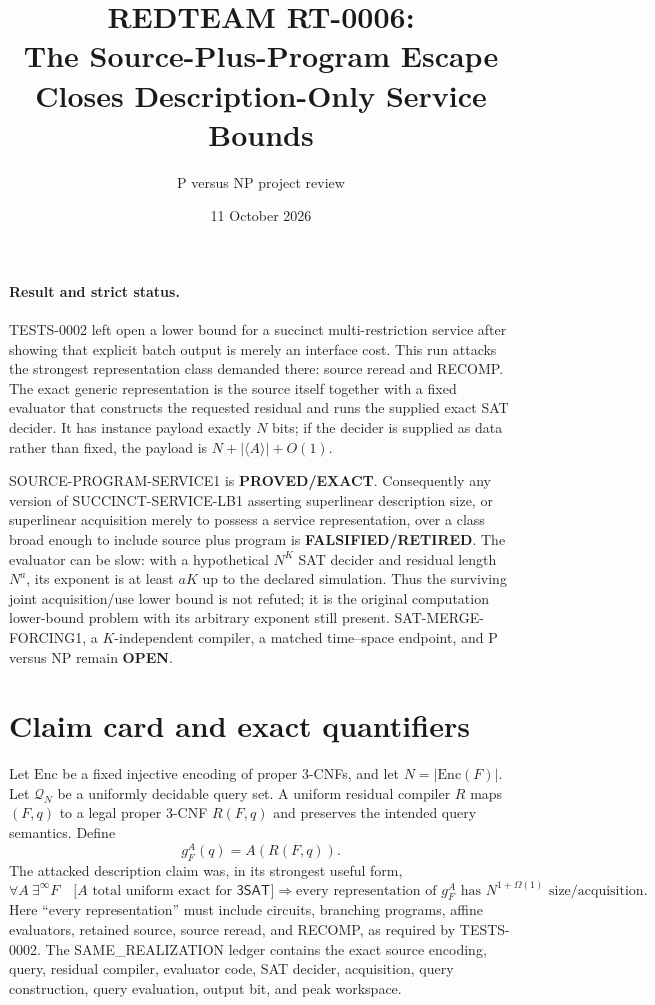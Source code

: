 \documentclass[11pt]{article}
\title{REDTEAM RT-0006:\\
The Source-Plus-Program Escape Closes Description-Only Service Bounds}
\author{P versus NP project review}
\date{11 October 2026}
\newcommand{\SAT}{\mathsf{3SAT}}
\newcommand{\status}[1]{\textbf{#1}}
\begin{document}
\maketitle

\paragraph{Result and strict status.}
TESTS-0002 left open a lower bound for a succinct multi-restriction service
after showing that explicit batch output is merely an interface cost.  This
run attacks the strongest representation class demanded there: source reread
and RECOMP.  The exact generic representation is the source itself together
with a fixed evaluator that constructs the requested residual and runs the
supplied exact SAT decider.  It has instance payload exactly $N$ bits; if the
decider is supplied as data rather than fixed, the payload is $N+|\langle
A\rangle|+O(1)$.

\textsf{SOURCE-PROGRAM-SERVICE1} is \status{PROVED/EXACT}.  Consequently any
version of \textsf{SUCCINCT-SERVICE-LB1} asserting superlinear description
size, or superlinear acquisition merely to possess a service representation,
over a class broad enough to include source plus program is
\status{FALSIFIED/RETIRED}.  The evaluator can be slow: with a hypothetical
$N^K$ SAT decider and residual length $N^a$, its exponent is at least $aK$
up to the declared simulation.  Thus the surviving joint acquisition/use
lower bound is not refuted; it is the original computation lower-bound
problem with its arbitrary exponent still present.  \textsf{SAT-MERGE-FORCING1},
a $K$-independent compiler, a matched time--space endpoint, and P versus NP
remain \status{OPEN}.

\section{Claim card and exact quantifiers}
Let $\mathrm{Enc}$ be a fixed injective encoding of proper 3-CNFs, and let
$N=|\mathrm{Enc}(F)|$.  Let $\mathcal Q_N$ be a uniformly decidable query
set.  A uniform residual compiler $R$ maps $(F,q)$ to a legal proper 3-CNF
$R(F,q)$ and preserves the intended query semantics.  Define
\[
 g_F^A(q)=A(R(F,q)).                                      \tag{1}
\]
The attacked description claim was, in its strongest useful form,
\[
 \forall A\ \exists^\infty F\quad
 \bigl[ A\text{ total uniform exact for }\SAT\bigr]
 \Longrightarrow
 \text{every representation of }g_F^A\text{ has }N^{1+\Omega(1)}
 \text{ size/acquisition}.                               \tag{2}
\]
Here ``every representation'' must include circuits, branching programs,
affine evaluators, retained source, source reread, and RECOMP, as required by
TESTS-0002.  The SAME\_REALIZATION ledger contains the exact source encoding,
query, residual compiler, evaluator code, SAT decider, acquisition, query
construction, query evaluation, output bit, and peak workspace.
\end{document}
